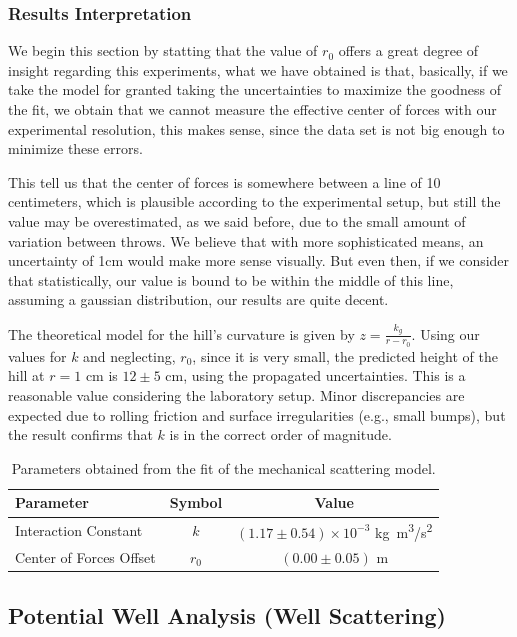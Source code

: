 \documentclass[a4paper,11pt]{article}
\begin{document}
\subsubsection{Results Interpretation}


We begin this section by statting that the value of $r_0$ offers a great degree of insight regarding this experiments, what we have obtained
is that, basically, if we take the model for granted taking the uncertainties to maximize the goodness of the fit, we obtain that we cannot measure the effective center of forces with our experimental resolution,
this makes sense, since the data set is not big enough to minimize these errors.

This tell us that the center of forces is somewhere between a line of 10 centimeters, which is plausible according to the experimental setup,
but still the value may be overestimated, as we said before, due to the small amount of variation between throws. We believe that with more sophisticated means, an uncertainty of 1cm would make more sense visually.
But even then, if we consider that statistically, our value is bound to be within the middle of this line, assuming a gaussian distribution, our results are quite decent.

The theoretical model for the hill's curvature is given by $z = \frac{k_g}{r-r_0}$. Using our values for $k$ and neglecting, $r_0$, since it is very small,  the predicted height of the hill at $r = 1$  \unit{cm} is $12 \pm 5$ \unit{cm}, using the propagated uncertainties. This is a reasonable value considering the laboratory setup. Minor discrepancies are expected due to rolling friction and surface irregularities (e.g., small bumps), but the result confirms that $k$ is in the correct order of magnitude.


\begin{table}[H]
    \centering
   \begin{tabular}{lcc}
        \toprule
        Parameter & Symbol & Value \\
        \midrule
        Interaction Constant & $k$ & $(1.17 \pm 0.54) \times 10^{-3}$ \unit{kg.m^3/s^2} \\
        Center of Forces Offset & $r_0$ & $(0.00 \pm 0.05)$ \unit{m} \\
        \bottomrule
    \end{tabular}
    \caption{Parameters obtained from the fit of the mechanical scattering model.}
    \label{tab:fit_results}
\end{table}
\subsection{Potential Well Analysis (Well Scattering)}
\end{document}
